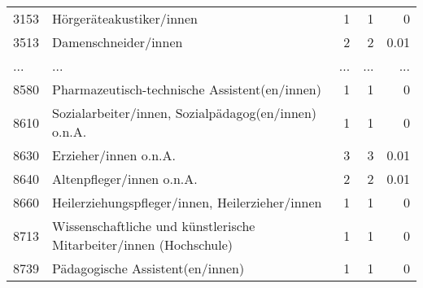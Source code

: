 \begin{longtable}{lXrrr}
        3153 & \multicolumn{1}{X}{Hörgeräteakustiker/innen} & %
          \num{1} &
          \num[round-mode=places,round-precision=2]{1} &
          \num[round-mode=places,round-precision=2]{0} \\
        3513 & \multicolumn{1}{X}{Damenschneider/innen} & %
          \num{2} &
          \num[round-mode=places,round-precision=2]{2} &
          \num[round-mode=places,round-precision=2]{0.01} \\
       ... & ... & ... & ... & ... \\
        8580 & \multicolumn{1}{X}{Pharmazeutisch-technische Assistent(en/innen)} & %
          \num{1} &
          \num[round-mode=places,round-precision=2]{1} &
          \num[round-mode=places,round-precision=2]{0} \\

        8610 & \multicolumn{1}{X}{Sozialarbeiter/innen, Sozialpädagog(en/innen) o.n.A.} & %
          \num{1} &
          \num[round-mode=places,round-precision=2]{1} &
          \num[round-mode=places,round-precision=2]{0} \\

        8630 & \multicolumn{1}{X}{Erzieher/innen o.n.A.} & %
          \num{3} &
          \num[round-mode=places,round-precision=2]{3} &
          \num[round-mode=places,round-precision=2]{0.01} \\

        8640 & \multicolumn{1}{X}{Altenpfleger/innen o.n.A.} & %
          \num{2} &
          \num[round-mode=places,round-precision=2]{2} &
          \num[round-mode=places,round-precision=2]{0.01} \\

        8660 & \multicolumn{1}{X}{Heilerziehungspfleger/innen, Heilerzieher/innen} & %
          \num{1} &
          \num[round-mode=places,round-precision=2]{1} &
          \num[round-mode=places,round-precision=2]{0} \\

        8713 & \multicolumn{1}{X}{Wissenschaftliche und künstlerische Mitarbeiter/innen (Hochschule)} & %
          \num{1} &
          \num[round-mode=places,round-precision=2]{1} &
          \num[round-mode=places,round-precision=2]{0} \\

        8739 & \multicolumn{1}{X}{Pädagogische Assistent(en/innen)} & %
          \num{1} &
          \num[round-mode=places,round-precision=2]{1} &
          \num[round-mode=places,round-precision=2]{0} \\


\end{longtable}
